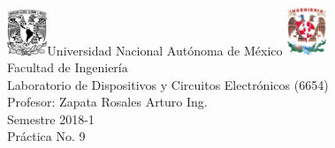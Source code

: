 

\begin{titlepage}
     \begin{center}
	\includegraphics[width=0.09\textwidth]{UNAM}\Large Universidad Nacional Autónoma de México
        	\includegraphics[width=0.09\textwidth]{FI}\\[1cm]
        \Large Facultad de Ingeniería\\[1cm]
         \Large Laboratorio de Dispositivos y Circuitos Electrónicos (6654)\\[1cm]
         \footnotesize Profesor: Zapata Rosales Arturo Ing.\\[1cm]
        \footnotesize Semestre 2018-1\\[1cm]
    
        
       
         
               
         
         
         
         
       

        \Large Práctica No. 9\\[1cm]
        
           

\end{center}
\end{titlepage}
